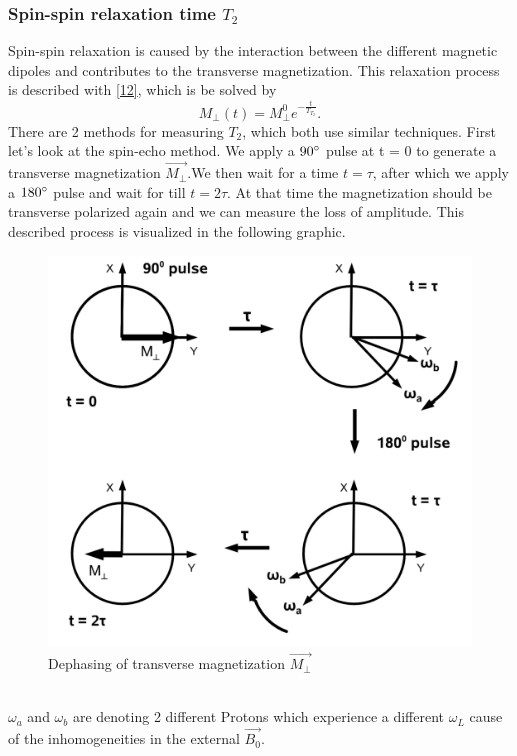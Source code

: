 \subsubsection{Spin-spin relaxation time $T_{2}$}
Spin-spin relaxation is caused by the interaction between the different magnetic dipoles and contributes to the transverse magnetization. This relaxation process is described with \eqref{12}, which is be solved by 
\begin{equation}
	\label{15}
	M_{\perp}(t) = M_{\perp}^{0}e^{-\frac{t}{T_{T_{2}}}}.
\end{equation}
There are 2 methods for measuring $T_2$, which both use similar techniques. First let's look at the spin-echo method. We apply a $90\degree$ pulse at t = 0 to generate a transverse magnetization $\vec{M_{\perp}}$.We then wait for a time $t=\tau$, after which we apply a $180\degree$ pulse and wait for till $t=2\tau$. At that time the magnetization should be transverse polarized again and we can measure the loss of amplitude. This described process is visualized in the following graphic.
\begin{figure}[h!]
	\centering
	\includegraphics[scale=0.53]{images/spin_echo.png}
	\caption{Dephasing of transverse magnetization $\vec{M_{\perp}}$}
	\label{spin-spin}
\end{figure} \\
$\omega_a$ and $\omega_b$ are denoting 2 different Protons which experience a different $\omega_L$ cause of the inhomogeneities in the external $\vec{B_0}$.\\

